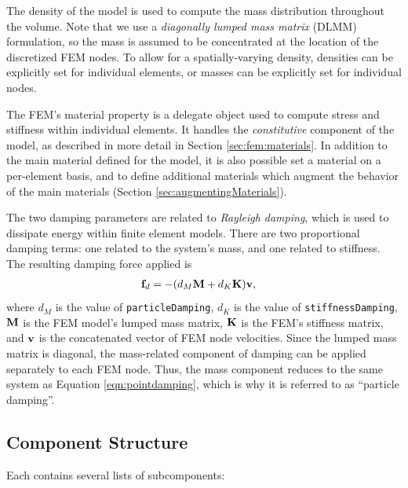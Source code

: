 The density of the model is used to compute the mass distribution
throughout the volume.  Note that we use a \emph{diagonally lumped
mass matrix} (DLMM) formulation, so the mass is assumed to be
concentrated at the location of the discretized FEM nodes.  To allow
for a spatially-varying density, densities can be explicitly set for
individual elements, or masses can be explicitly set for individual
nodes.

The FEM's {\sf material} property is a delegate object used to compute
stress and stiffness within individual elements.  It handles
the \emph{constitutive} component of the model, as described in more
detail in Section \ref{sec:fem:materials}.
In addition to the main material defined
for the model, it is also possible set a material on a per-element
basis, and to define additional materials which augment the behavior
of the main materials (Section \ref{sec:augmentingMaterials}).

The two damping parameters are related to \emph{Rayleigh damping}, which
is used to dissipate energy within finite element models.  There are two 
proportional damping terms: one related to the system's mass, and one related 
to stiffness.  The resulting damping force applied is
\begin{align}
	{\bf f}_d & = - (d_M {\bf M} + d_K{\bf K}){\bf v},
\end{align}
where $d_M$ is the value of {\tt particleDamping}, $d_K$ is the value of 
{\tt stiffnessDamping}, ${\bf M}$ is the FEM model's lumped mass matrix, ${\bf K}$ is 
the FEM's stiffness matrix, and ${\bf v}$ is the concatenated vector of FEM node
velocities.  Since the lumped mass matrix is diagonal, the mass-related
component of damping can be applied separately to each FEM node.  Thus, the
mass component reduces to the same system as Equation \eqref{eqn:pointdamping},
which is why it is referred to as ``particle damping''.

\subsection{Component Structure}
\label{sec:componentStructure}

Each  contains several 
lists of subcomponents:

